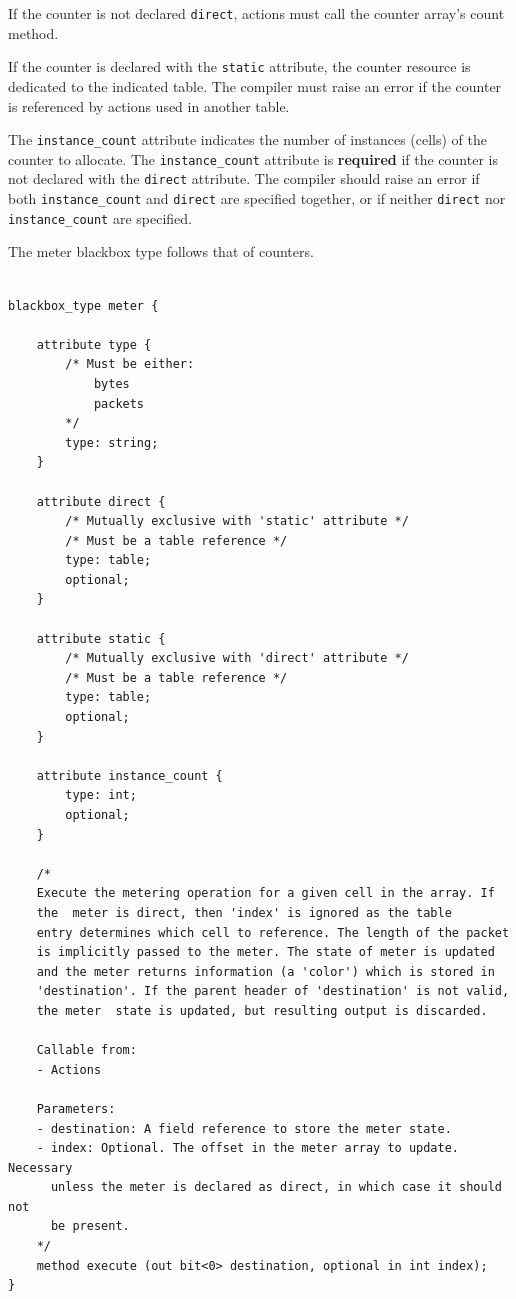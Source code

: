 \documentclass[12pt]{article}
\begin{document}
If the counter is not declared \texttt{direct}, actions must call the
counter array's count method.

If the counter is declared with the \texttt{static} attribute, the
counter resource is dedicated to the indicated table. The compiler
must raise an error if the counter is referenced by actions used
in another table.

The \texttt{instance_count} attribute indicates the number of
instances (cells) of the counter to allocate. The
\texttt{instance_count} attribute is \textbf{required} if the counter
is not declared with the \texttt{direct} attribute.  The compiler
should raise an error if both \texttt{instance_count} and
\texttt{direct} are specified together, or if neither \texttt{direct}
nor \texttt{instance_count} are specified.  


The meter blackbox type follows that of counters.

\begin{lstlisting}[style=P4style]

blackbox_type meter {
        
    attribute type {
        /* Must be either:
            bytes
            packets
        */
        type: string;
    }

    attribute direct {
        /* Mutually exclusive with 'static' attribute */
        /* Must be a table reference */
        type: table;
        optional;
    }

    attribute static {
        /* Mutually exclusive with 'direct' attribute */
        /* Must be a table reference */
        type: table;
        optional;
    }

    attribute instance_count {
        type: int;
        optional;
    }

    /*  
    Execute the metering operation for a given cell in the array. If
    the  meter is direct, then 'index' is ignored as the table
    entry determines which cell to reference. The length of the packet
    is implicitly passed to the meter. The state of meter is updated
    and the meter returns information (a 'color') which is stored in 
    'destination'. If the parent header of 'destination' is not valid,
    the meter  state is updated, but resulting output is discarded.

    Callable from:
    - Actions

    Parameters:
    - destination: A field reference to store the meter state.
    - index: Optional. The offset in the meter array to update. Necessary
      unless the meter is declared as direct, in which case it should not
      be present.
    */
    method execute (out bit<0> destination, optional in int index);
}

\end{lstlisting}
\end{document}
